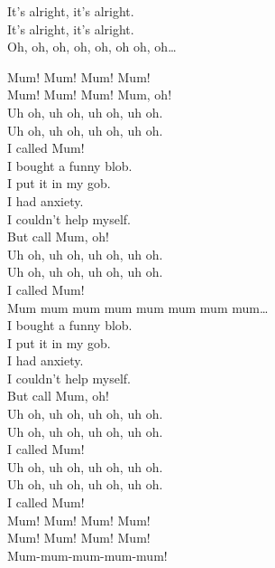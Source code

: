 It's alright, it's alright. \\
It's alright, it's alright. \\

Oh, oh, oh, oh, oh, oh oh, oh… \\




Mum! Mum! Mum! Mum! \\
Mum! Mum! Mum! Mum, oh! \\

Uh oh, uh oh, uh oh, uh oh. \\
Uh oh, uh oh, uh oh, uh oh. \\
I called Mum! \\

I bought a funny blob. \\
I put it in my gob. \\
I had anxiety. \\
I couldn't help myself. \\
But call Mum, oh! \\

Uh oh, uh oh, uh oh, uh oh. \\
Uh oh, uh oh, uh oh, uh oh. \\
I called Mum! \\

Mum mum mum mum mum mum mum mum… \\

I bought a funny blob. \\
I put it in my gob. \\
I had anxiety. \\
I couldn't help myself. \\
But call Mum, oh! \\

Uh oh, uh oh, uh oh, uh oh. \\
Uh oh, uh oh, uh oh, uh oh. \\
I called Mum! \\

Uh oh, uh oh, uh oh, uh oh. \\
Uh oh, uh oh, uh oh, uh oh. \\
I called Mum! \\

Mum! Mum! Mum! Mum! \\
Mum! Mum! Mum! Mum! \\
Mum-mum-mum-mum-mum! \\

